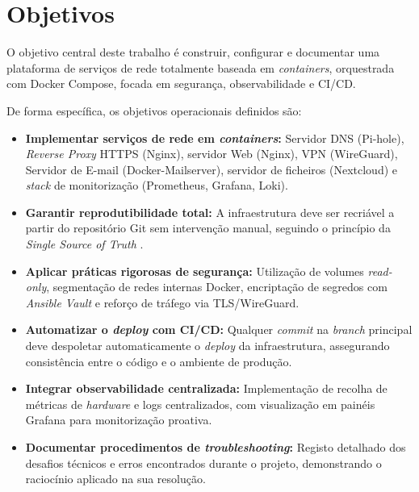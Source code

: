 \section{Objetivos}

O objetivo central deste trabalho é construir, configurar e documentar uma plataforma de serviços de rede totalmente baseada em \textit{containers}, orquestrada com Docker Compose, focada em segurança, observabilidade e CI/CD.

De forma específica, os objetivos operacionais definidos são:

\begin{itemize}
    \item \textbf{Implementar serviços de rede em \textit{containers}:} Servidor DNS (Pi-hole), \textit{Reverse Proxy} HTTPS (Nginx), servidor Web (Nginx), VPN (WireGuard), Servidor de E-mail (Docker-Mailserver), servidor de ficheiros (Nextcloud) e \textit{stack} de monitorização (Prometheus, Grafana, Loki).
    
    \item \textbf{Garantir reprodutibilidade total:} A infraestrutura deve ser recriável a partir do repositório Git sem intervenção manual, seguindo o princípio da \textit{Single Source of Truth} \cite{morris2016infrastructure}.
    
    \item \textbf{Aplicar práticas rigorosas de segurança:} Utilização de volumes \textit{read-only}, segmentação de redes internas Docker, encriptação de segredos com \textit{Ansible Vault} e reforço de tráfego via TLS/WireGuard.
    
    \item \textbf{Automatizar o \textit{deploy} com CI/CD:} Qualquer \textit{commit} na \textit{branch} principal deve despoletar automaticamente o \textit{deploy} da infraestrutura, assegurando consistência entre o código e o ambiente de produção.
    
    \item \textbf{Integrar observabilidade centralizada:} Implementação de recolha de métricas de \textit{hardware} e logs centralizados, com visualização em painéis Grafana para monitorização proativa.
    
    \item \textbf{Documentar procedimentos de \textit{troubleshooting}:} Registo detalhado dos desafios técnicos e erros encontrados durante o projeto, demonstrando o raciocínio aplicado na sua resolução.
\end{itemize}

